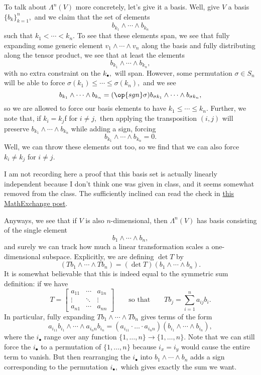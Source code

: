 \documentclass[../notes.tex]{subfiles}
\begin{document}
To talk about $\Lambda^n(V)$ more concretely, let's give it a basis. Well, give $V$ a basis $\{b_k\}_{k=1}^n,$ and we claim that the set of elements
\[b_{k_1}\wedge\cdots\wedge b_{k_n}\]
such that $k_1<\cdots<k_n.$ To see that these elements span, we see that fully expanding some generic element $v_1\wedge\cdots\wedge v_n$ along the basis and fully distributing along the tensor product, we see that at least the elements
\[b_{k_1}\wedge\cdots\wedge b_{k_n},\]
with no extra constraint on the $k_\bullet,$ will span. However, some permutation $\sigma\in S_n$ will be able to force $\sigma(k_1)\le\cdots\le\sigma(k_n),$ and we see
\[b_{k_1}\wedge\cdots\wedge b_{k_n}=(\op{sgn}\sigma)b_{\sigma k_1}\wedge\cdots\wedge b_{\sigma k_n},\]
so we are allowed to force our basis elements to have $k_1\le\cdots\le k_n.$ Further, we note that, if $k_i=k_j$f for $i\ne j,$ then applying the transposition $(i,j)$ will preserve $b_{k_1}\wedge\cdots\wedge b_{k_n}$ while adding a sign, forcing
\[b_{k_1}\wedge\cdots\wedge b_{k_n}=0.\]
Well, we can throw these elements out too, so we find that we can also force $k_i\ne k_j$ for $i\ne j.$
\begin{remark}[Nir]
	I am not recording here a proof that this basis set is actually linearly independent because I don't think one was given in class, and it seems somewhat removed from the class. The sufficiently inclined can read the check in \href{https://math.stackexchange.com/a/53562/869257}{this MathExchange post}.
\end{remark}
Anyways, we see that if $V$ is also $n$-dimensional, then $\Lambda^n(V)$ has basis consisting of the single element
\[b_1\wedge\cdots\wedge b_n,\]
and surely we can track how much a linear transformation scales a one-dimensional subspace. Explicitly, we are defining $\det T$ by
\[(Tb_1\wedge\cdots\wedge Tb_n)=(\det T)(b_1\wedge\cdots\wedge b_n).\]
It is somewhat believable that this is indeed equal to the symmetric sum definition: if we have
\[T=\begin{bmatrix}
	a_{11} & \cdots & a_{1n} \\
	\vdots & \ddots & \vdots \\
	a_{n1} & \cdots & a_{nn}
\end{bmatrix}\qquad\text{so that}\qquad Tb_j=\sum_{i=1}^na_{ij}b_i.\]
In particular, fully expanding $Tb_1\wedge\cdots\wedge Tb_n$ gives terms of the form
\[a_{i_11}b_{i_1}\wedge\cdots\wedge a_{i_nn}b_{i_n}=(a_{i_11}\cdot\ldots\cdot a_{i_nn})(b_{i_1}\wedge\cdots\wedge b_{i_n}),\]
where the $i_\bullet$ range over any function $\{1,\ldots,n\}\to\{1,\ldots,n\}.$ Note that we can still force the $i_\bullet$ to a permutation of $\{1,\ldots,n\}$ because $i_x=i_y$ would cause the entire term to vanish. But then rearranging the $i_\bullet$ into $b_1\wedge\cdots\wedge b_n$ adds a sign corresponding to the permutation $i_\bullet,$ which gives exactly the sum we want.
\end{document}
